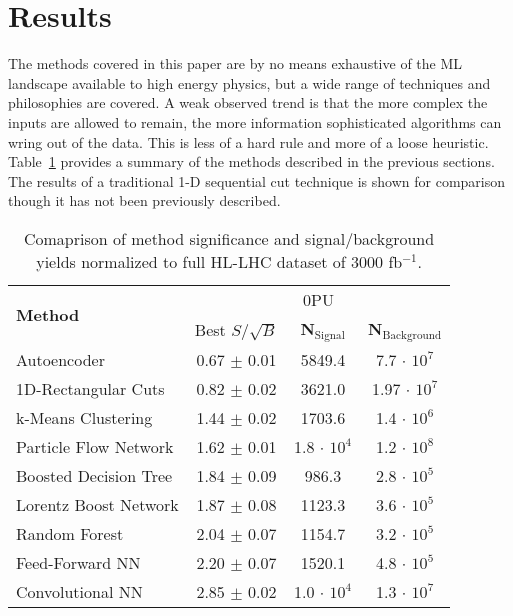 \section{Results}
\label{sec:results}

The methods covered in this paper are by no means exhaustive of the ML landscape available to high energy physics, but a wide range of techniques and philosophies are covered. A weak observed trend is that the more complex the inputs are allowed to remain, the more information sophisticated algorithms can wring out of the data. This is less of a hard rule and more of a loose heuristic. Table~\ref{tab:summary} provides a summary of the methods described in the previous sections. The results of a traditional 1-D sequential cut technique is shown for comparison though it has not been previously described. 

\begin{table}[h!]
\label{tab:summary}
  \begin{center}
  \begin{tabular}{|l|c|c|c|} %
      \hline\hline
      \multirow{2}{*}{\textbf{Method}} & \multicolumn{3}{c|}{0PU} \\
      \cline{2-4}
      & Best $S/\sqrt{B}$ & \textbf{N$_{\mathrm{Signal}}$} & \textbf{N$_{\mathrm{Background}}$} \\
      \hline
      Autoencoder           & 0.67 $\pm$ 0.01 & 5849.4 & 7.7 $\cdot$ $10^7$ \\
      1D-Rectangular Cuts   & 0.82 $\pm$ 0.02 & 3621.0 & 1.97 $\cdot$ $10^7$ \\
      k-Means Clustering    & 1.44 $\pm$ 0.02 & 1703.6 & 1.4 $\cdot$ $10^6$ \\
      Particle Flow Network & 1.62 $\pm$ 0.01 & 1.8 $\cdot$ $10^4$ & 1.2 $\cdot$ $10^8$ \\
      Boosted Decision Tree & 1.84 $\pm$ 0.09 & 986.3  & 2.8 $\cdot$ $10^5$ \\
      Lorentz Boost Network & 1.87 $\pm$ 0.08 & 1123.3 & 3.6 $\cdot$ $10^5$ \\
      Random Forest         & 2.04 $\pm$ 0.07 & 1154.7 & 3.2 $\cdot$ $10^5$ \\
      Feed-Forward NN       & 2.20 $\pm$ 0.07 & 1520.1 & 4.8 $\cdot$ $10^5$ \\
      Convolutional NN      & 2.85 $\pm$ 0.02 & 1.0 $\cdot$ $10^4$ & 1.3 $\cdot$ $10^7$ \\
      \hline\hline
    \end{tabular}
    \caption{Comaprison of method significance and signal/background yields normalized to full HL-LHC dataset of 3000 fb$^{-1}$.}
  \end{center}
\end{table}

